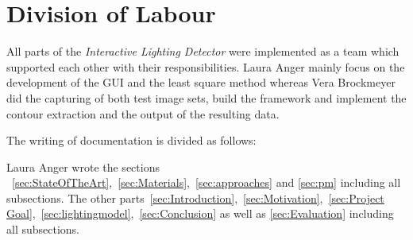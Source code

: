 \section{Division of Labour } \label{sec:Division}
All parts of the \textit{Interactive Lighting Detector} were implemented as a team which supported each other with their responsibilities. Laura Anger mainly focus on the development of the GUI and the least square method whereas Vera Brockmeyer did the capturing of both test image sets, build the framework and implement the contour extraction and the output of the resulting data. 

The writing of documentation is divided as follows: 

Laura Anger wrote the sections ~\ref{sec:StateOfTheArt},~\ref{sec:Materials},~\ref{sec:approaches} and \ref{sec:pm} including all subsections. 
The other parts~\ref{sec:Introduction},~\ref{sec:Motivation},~\ref{sec:Project Goal},~\ref{sec:lightingmodel},~\ref{sec:Conclusion} as well as \ref{sec:Evaluation} including all subsections.

\newpage

























